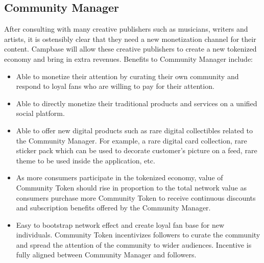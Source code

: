 \documentclass[letterpaper,11pt]{article}
\begin{document}
\subsection{Community Manager}
After consulting with many creative publishers such as musicians, writers and artists, it is ostensibly clear that they need a new monetization channel for their content. Campbase will allow these creative publishers to create a new tokenized economy and bring in extra revenues.
\newline
\newline
Benefits to Community Manager include:
\begin{itemize}
\item Able to monetize their attention by curating their own community and respond to loyal fans who are willing to pay for their attention.
\item Able to directly monetize their traditional products and services on a unified social platform.
\item Able to offer new digital products such as rare digital collectibles related to the Community Manager. For example, a rare digital card collection, rare sticker pack which can be used to decorate customer’s picture on a feed, rare theme to be used inside the application, etc.
\item As more consumers participate in the tokenized economy, value of Community Token should rise in proportion to the total network value as consumers purchase more Community Token to receive continuous discounts and subscription benefits offered by the Community Manager.
\item Easy to bootstrap network effect and create loyal fan base for new individuals. Community Token incentivizes followers to curate the community and spread the attention of the community to wider audiences. Incentive is fully aligned between Community Manager and followers.
\end{itemize}
\end{document}
